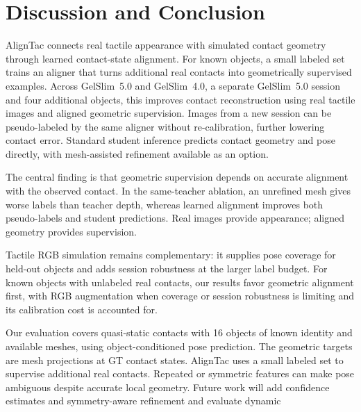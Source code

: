 \section{Discussion and Conclusion}

AlignTac connects real tactile appearance with simulated contact geometry through learned contact-state alignment. For known objects, a small labeled set trains an aligner that turns additional real contacts into geometrically supervised examples. Across GelSlim~5.0 and GelSlim~4.0, a separate GelSlim~5.0 session and four additional objects, this improves contact reconstruction using real tactile images and aligned geometric supervision. Images from a new session can be pseudo-labeled by the same aligner without re-calibration, further lowering contact error. Standard student inference predicts contact geometry and pose directly, with mesh-assisted refinement available as an option.

The central finding is that geometric supervision depends on accurate alignment with the observed contact. In the same-teacher ablation, an unrefined mesh gives worse labels than teacher depth, whereas learned alignment improves both pseudo-labels and student predictions. Real images provide appearance; aligned geometry provides supervision.

Tactile RGB simulation remains complementary: it supplies pose coverage for held-out objects and adds session robustness at the larger label budget. For known objects with unlabeled real contacts, our results favor geometric alignment first, with RGB augmentation when coverage or session robustness is limiting and its calibration cost is accounted for.

Our evaluation covers quasi-static contacts with 16 objects of known identity and available meshes, using object-conditioned pose prediction. The geometric targets are mesh projections at GT contact states. AlignTac uses a small labeled set to supervise additional real contacts. Repeated or symmetric features can make pose ambiguous despite accurate local geometry. Future work will add confidence estimates and symmetry-aware refinement and evaluate dynamic 
